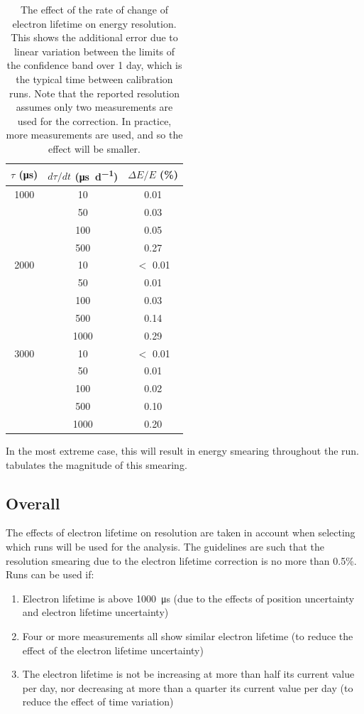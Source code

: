 \documentclass[herrin-thesis.tex]{subfiles}
\begin{document}
\begin{table}[htd]
\centering
\begin{tabular}{c|c|c}
	\(\tau\) (\si{\micro\second})	&	\(d\tau/dt\) (\si{\micro\second\per\day})	&	\(\Delta E / E\) (\%) 	\\ \hline
	1000					&	10			&	0.01				\\
						&	50			&	0.03				\\
						&	100			&	0.05				\\
						&	500			&	0.27				\\ \hline
	2000					&	10			&	\(<\) 0.01			\\
						&	50			&	0.01				\\
						&	100			&	0.03				\\
						&	500			&	0.14				\\
						&	1000			&	0.29				\\ \hline
	3000					&	10			&	\(<\) 0.01			\\
						&	50			&	0.01				\\
						&	100			&	0.02				\\
						&	500			&	0.10				\\
						&	1000			&	0.20						
\end{tabular}
\caption[Electron lifetime time variance effect on resolution]{The effect of the rate of change of electron lifetime on energy resolution. This shows the additional error due to linear variation between the limits of the confidence band over 1 day, which is the typical time between calibration runs. Note that the reported resolution assumes only two measurements are used for the correction. In practice, more measurements are used, and so the effect will be smaller.}
\label{tab:el_res_dtaudt}
\end{table}

In the most extreme case, this will result in energy smearing throughout the run.  tabulates the magnitude of this smearing.

\subsection{Overall}
The effects of electron lifetime on resolution are taken in account when selecting which runs will be used for the analysis. The guidelines are such that the resolution smearing due to the electron lifetime correction is no more than 0.5\%. Runs can be used if:
\begin{enumerate}
\item Electron lifetime is above \SI{1000}{\micro\second} (due to the effects of position uncertainty and electron lifetime uncertainty)
\item Four or more measurements all show similar electron lifetime (to reduce the effect of the electron lifetime uncertainty)
\item The electron lifetime is not be increasing at more than half its current value per day, nor decreasing at more than a quarter its current value per day (to reduce the effect of time variation)
\end{enumerate}
\end{document}
